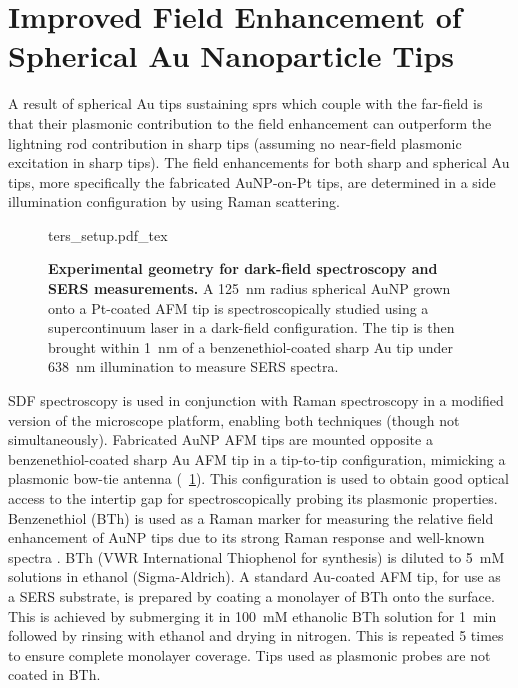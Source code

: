 \documentclass{article}
\begin{document}
\section{Improved Field Enhancement of Spherical Au Nanoparticle Tips}
\label{sec:tip_applications}

A result of spherical Au tips sustaining \glspl{spr} which couple with the far-field is that their plasmonic contribution to the field enhancement can outperform the lightning rod contribution in sharp tips (assuming no near-field plasmonic excitation in sharp tips). The field enhancements for both sharp and spherical Au tips, more specifically the fabricated AuNP-on-Pt tips, are determined in a side illumination configuration by using Raman scattering.

\begin{figure}[bt]
\centering
\def\svgwidth{0.6\textwidth}
{ters_setup.pdf_tex}
\caption[Experimental geometry for dark-field spectroscopy and SERS measurements]{\textbf{Experimental geometry for dark-field spectroscopy and SERS measurements.} A \SI{125}{nm} radius spherical AuNP grown onto a Pt-coated AFM tip is spectroscopically studied using a supercontinuum laser in a dark-field configuration. The tip is then brought within \SI{1}{nm} of a benzenethiol-coated sharp Au tip under \SI{638}{nm} illumination to measure SERS spectra.}
\label{fig:ters_setup}
\end{figure}

SDF spectroscopy is used in conjunction with Raman spectroscopy in a modified version of the microscope platform, enabling both techniques (though not simultaneously). Fabricated AuNP AFM tips are mounted opposite a benzenethiol-coated sharp Au AFM tip in a tip-to-tip configuration, mimicking a plasmonic bow-tie antenna (\figurename~\ref{fig:ters_setup}). This configuration is used to obtain good optical access to the intertip gap for spectroscopically probing its plasmonic properties. Benzenethiol (BTh) is used as a Raman marker for measuring the relative field enhancement of AuNP tips due to its strong Raman response and well-known spectra \cite{mahajan2009, dudin2010}.
BTh (VWR International Thiophenol for synthesis) is diluted to \SI{5}{mM} solutions in ethanol (Sigma-Aldrich). A standard Au-coated AFM tip, for use as a SERS substrate, is prepared by coating a monolayer of BTh onto the surface. This is achieved by submerging it in \SI{100}{mM} ethanolic BTh solution for \SI{1}{\minute} followed by rinsing with ethanol and drying in nitrogen. This is repeated 5 times to ensure complete monolayer coverage. Tips used as plasmonic probes are not coated in BTh.
\end{document}
